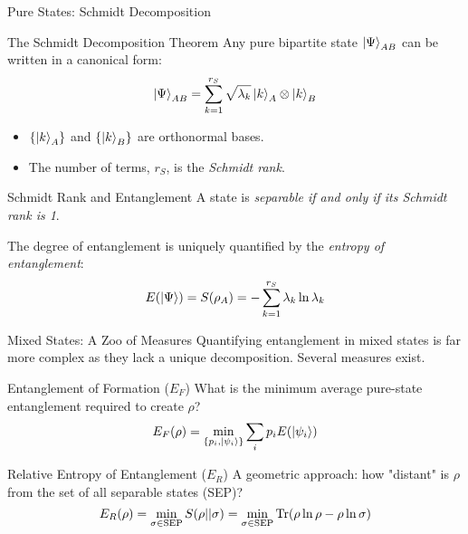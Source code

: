 \begin{frame}{Pure States: Schmidt Decomposition}
  \begin{block}{The Schmidt Decomposition Theorem}
    Any pure bipartite state $\ket{\Psi}_{AB}$ can be written in a canonical form:
    \begin{equation}
      \ket{\Psi}_{AB} = \sum_{k=1}^{r_S} \sqrt{\lambda_k} \ket{k}_A \otimes \ket{k}_B
    \end{equation}
    \begin{itemize}
      \item $\{\ket{k}_A\}$ and $\{\ket{k}_B\}$ are orthonormal bases.
      \item The number of terms, $r_S$, is the \emph{Schmidt rank}.
    \end{itemize}
  \end{block}
\end{frame}

\begin{frame}
  \begin{alertblock}{Schmidt Rank and Entanglement}
    A state is \emph{separable if and only if its Schmidt rank is 1}.

    The degree of entanglement is uniquely quantified by the \emph{entropy of entanglement}:
    \begin{equation}
      E(\ket{\Psi}) = S(\rho_A) = -\sum_{k=1}^{r_S} \lambda_k \ln \lambda_k
    \end{equation}
  \end{alertblock}
\end{frame}


\begin{frame}{Mixed States: A Zoo of Measures}
  Quantifying entanglement in mixed states is far more complex as they lack a
  unique decomposition. Several measures exist.
  \pause
  \begin{block}{Entanglement of Formation (\texorpdfstring{$E_F$}{E\_F})}
    What is the minimum average pure-state entanglement required to create $\rho$?
    \[ E_F(\rho) = \min_{\{p_i, \ket{\psi_i}\}} \sum_i p_i E(\ket{\psi_i}) \]
  \end{block}
  \pause
  \begin{block}{Relative Entropy of Entanglement (\texorpdfstring{$E_R$}{E\_R})}
    A geometric approach: how "distant" is $\rho$ from the set of all separable
    states (SEP)?
    \[ E_R(\rho) = \min_{\sigma \in \text{SEP}} S(\rho || \sigma) = \min_{\sigma
    \in \text{SEP}} \mathrm{Tr}(\rho \ln \rho - \rho \ln \sigma) \]
  \end{block}
\end{frame}

